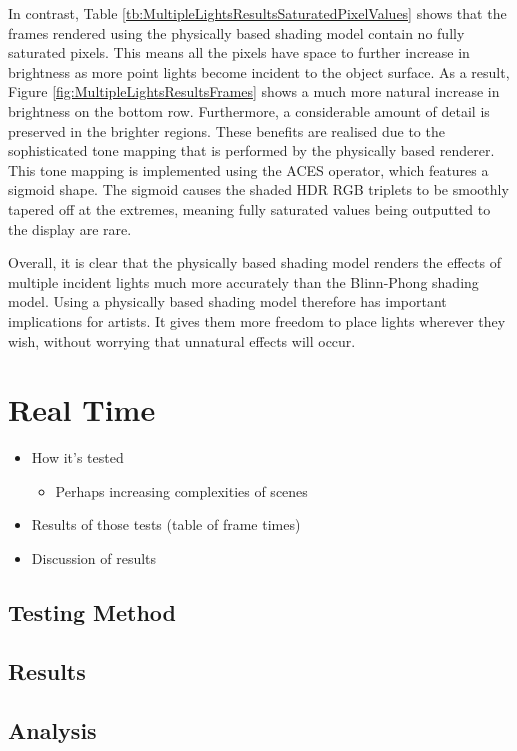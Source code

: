 In contrast, Table \ref{tb:MultipleLightsResultsSaturatedPixelValues} shows that the frames rendered using the physically based shading model contain no fully saturated pixels. This means all the pixels have space to further increase in brightness as more point lights become incident to the object surface. As a result, Figure \ref{fig:MultipleLightsResultsFrames} shows a much more natural increase in brightness on the bottom row. Furthermore, a considerable amount of detail is preserved in the brighter regions. These benefits are realised due to the sophisticated tone mapping that is performed by the physically based renderer. This tone mapping is implemented using the ACES operator, which features a sigmoid shape. The sigmoid causes the shaded HDR RGB triplets to be smoothly tapered off at the extremes, meaning fully saturated values being outputted to the display are rare.

Overall, it is clear that the physically based shading model renders the effects of multiple incident lights much more accurately than the Blinn-Phong shading model. Using a physically based shading model therefore has important implications for artists. It gives them more freedom to place lights wherever they wish, without worrying that unnatural effects will occur.

\section{Real Time}

\begin{itemize}
	\item How it's tested
	\begin{itemize}
		\item Perhaps increasing complexities of scenes
	\end{itemize}
	\item Results of those tests (table of frame times)
	\item Discussion of results
\end{itemize}

\subsection{Testing Method}

\subsection{Results}

\subsection{Analysis}
